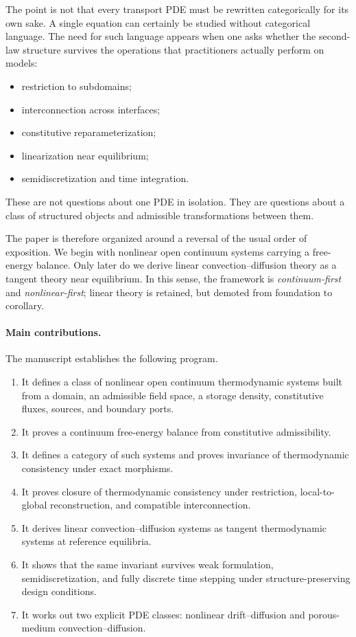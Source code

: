 \documentclass[11pt]{article}
\begin{document}
The point is not that every transport PDE must be rewritten categorically for its own
sake. A single equation can certainly be studied without categorical language. The
need for such language appears when one asks whether the second-law structure survives
the operations that practitioners actually perform on models:
\begin{itemize}[leftmargin=1.2cm]
    \item restriction to subdomains;
    \item interconnection across interfaces;
    \item constitutive reparameterization;
    \item linearization near equilibrium;
    \item semidiscretization and time integration.
\end{itemize}
These are not questions about one PDE in isolation. They are questions about a class
of structured objects and admissible transformations between them.

The paper is therefore organized around a reversal of the usual order of exposition.
We begin with nonlinear open continuum systems carrying a free-energy balance. Only
later do we derive linear convection--diffusion theory as a tangent theory near
equilibrium. In this sense, the framework is \emph{continuum-first} and
\emph{nonlinear-first}; linear theory is retained, but demoted from foundation to
corollary.

\paragraph{Main contributions.}
The manuscript establishes the following program.
\begin{enumerate}[label=(\roman*),leftmargin=1.1cm]
    \item It defines a class of nonlinear open continuum thermodynamic systems built
    from a domain, an admissible field space, a storage density, constitutive fluxes,
    sources, and boundary ports.
    \item It proves a continuum free-energy balance from constitutive admissibility.
    \item It defines a category of such systems and proves invariance of
    thermodynamic consistency under exact morphisms.
    \item It proves closure of thermodynamic consistency under restriction,
    local-to-global reconstruction, and compatible interconnection.
    \item It derives linear convection--diffusion systems as tangent thermodynamic
    systems at reference equilibria.
    \item It shows that the same invariant survives weak formulation,
    semidiscretization, and fully discrete time stepping under structure-preserving
    design conditions.
    \item It works out two explicit PDE classes: nonlinear drift--diffusion and
    porous-medium convection--diffusion.
\end{enumerate}
\end{document}
